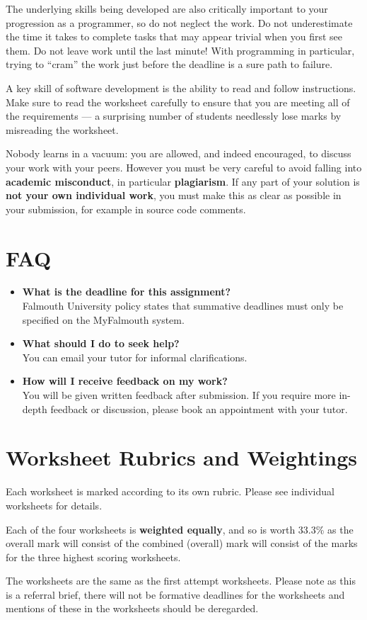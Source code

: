 \documentclass{../../fal_assignment}
\begin{document}
The underlying skills being developed are also critically important to your progression as a programmer, so do not neglect the work.
Do not underestimate the time it takes to complete tasks that may appear trivial when you first see them.
Do not leave work until the last minute! With programming in particular, trying to ``cram'' the work just before the deadline is a sure path to failure.

A key skill of software development is the ability to read and follow instructions.
Make sure to read the worksheet carefully to ensure that you are meeting all of the requirements ---
a surprising number of students needlessly lose marks by misreading the worksheet.

Nobody learns in a vacuum: you are allowed, and indeed encouraged, to discuss your work with your peers. However you must be very careful to avoid falling into \textbf{academic misconduct}, in particular \textbf{plagiarism}. If any part of your solution is \textbf{not your own individual work}, you must make this as clear as possible in your submission, for example in source code comments.

\section*{FAQ}

\begin{itemize}
	\item 	\textbf{What is the deadline for this assignment?} \\ 
			Falmouth University policy states that summative deadlines must only be specified on the MyFalmouth system.
    		
	\item 	\textbf{What should I do to seek help?} \\ 
    		You can email your tutor for informal clarifications.
    		
	\item 	\textbf{How will I receive feedback on my work?} \\ 
    		You will be given written feedback after submission.
    		If you require more in-depth feedback or discussion, please book an appointment with your tutor.
\end{itemize}


\section*{Worksheet Rubrics and Weightings}
Each worksheet is marked according to its own rubric. Please see individual worksheets for details.

Each of the four worksheets is \textbf{weighted equally}, and so is worth 33.3\% as the overall mark will consist of the combined (overall) mark will consist of the marks for the three highest scoring worksheets.

The worksheets are the same as the first attempt worksheets. Please note as this is a referral brief, there will not be formative deadlines for the worksheets and mentions of these in the worksheets should be deregarded.
\end{document}

